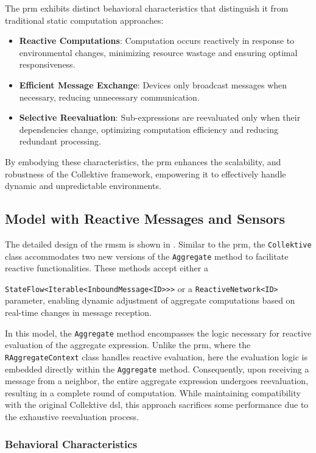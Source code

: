 The \ac{prm} exhibits distinct behavioral characteristics that distinguish it from traditional static computation approaches:

\begin{itemize}
    \item \textbf{Reactive Computations}: Computation occurs reactively in response to environmental changes, minimizing resource wastage and ensuring optimal responsiveness.
    \item \textbf{Efficient Message Exchange}: Devices only broadcast messages when necessary, reducing unnecessary communication.
    \item \textbf{Selective Reevaluation}: Sub-expressions are reevaluated only when their dependencies change, optimizing computation efficiency and reducing redundant processing.
\end{itemize}

By embodying these characteristics, the \ac{prm} enhances the scalability, and robustness of the Collektive framework, empowering it to effectively handle dynamic and unpredictable environments.

\subsection{Model with Reactive Messages and Sensors}
The detailed design of the \ac{rmsm} is shown in . Similar to the \ac{prm}, the \texttt{Collektive} class accommodates two new versions of the \texttt{Aggregate} method to facilitate reactive functionalities. These methods accept either a

\texttt{StateFlow<Iterable<InboundMessage<ID>>>} or a \texttt{ReactiveNetwork<ID>} parameter, enabling dynamic adjustment of aggregate computations based on real-time changes in message reception.

In this model, the \texttt{Aggregate} method encompasses the logic necessary for reactive evaluation of the aggregate expression. Unlike the \ac{prm}, where the \texttt{RAggregateContext} class handles reactive evaluation, here the evaluation logic is embedded directly within the \texttt{Aggregate} method. Consequently, upon receiving a message from a neighbor, the entire aggregate expression undergoes reevaluation, resulting in a complete round of computation. While maintaining compatibility with the original Collektive \ac{dsl}, this approach sacrifices some performance due to the exhaustive reevaluation process.

\subsubsection{Behavioral Characteristics}

